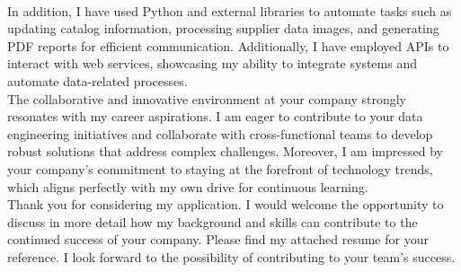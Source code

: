 \documentclass[11pt, a4paper]{awesome-cv}
\begin{document}
\begin{cvletter}
\\In addition, I have used Python and external libraries to automate tasks such as updating catalog information, processing supplier data images, and generating PDF reports for efficient communication. Additionally, I have employed APIs to interact with web services, showcasing my ability to integrate systems and automate data-related processes.
\\The collaborative and innovative environment at your company strongly resonates with my career aspirations. I am eager to contribute to your data engineering initiatives and collaborate with cross-functional teams to develop robust solutions that address complex challenges. Moreover, I am impressed by your company's commitment to staying at the forefront of technology trends, which aligns perfectly with my own drive for continuous learning.
\\Thank you for considering my application. I would welcome the opportunity to discuss in more detail how my background and skills can contribute to the continued success of your company. Please find my attached resume for your reference. I look forward to the possibility of contributing to your team's success.





\end{cvletter}
\end{document}
